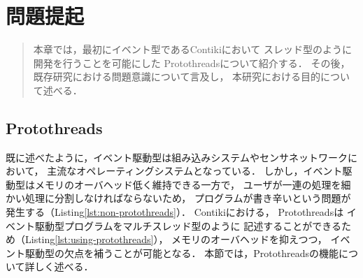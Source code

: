 \chapter{問題提起}
\begin{large}
\begin{quote}
本章では，最初にイベント型であるContikiにおいて
スレッド型のように開発を行うことを可能にした
Protothreadsについて紹介する．
その後，既存研究における問題意識について言及し，
本研究における目的について述べる．


\end{quote}
\end{large}
\clearpage

\section{Protothreads}\label{sec:protothreads}
既に述べたように，イベント駆動型は組み込みシステムやセンサネットワークにおいて，
主流なオペレーティングシステムとなっている．
しかし，イベント駆動型はメモリのオーバヘッド低く維持できる一方で，
ユーザが一連の処理を細かい処理に分割しなければならないため，
プログラムが書き辛いという問題が発生する（Listing\ref{lst:non-protothreads}）．
Contikiにおける，
Protothreads\cite{Dunkels:2006:PSE:1182807.1182811}は
イベント駆動型プログラムをマルチスレッド型のように
記述することができるため（Listing\ref{lst:using-protothreads}），
メモリのオーバヘッドを抑えつつ，
イベント駆動型の欠点を補うことが可能となる．
本節では，Protothreadsの機能について詳しく述べる．



